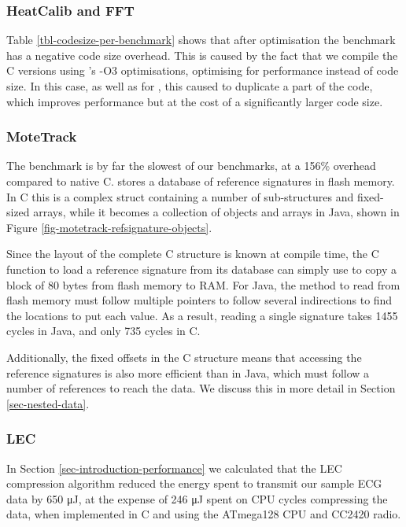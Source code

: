 \subsubsection{HeatCalib and FFT}
Table \ref{tbl-codesize-per-benchmark} shows that after optimisation the  benchmark has a negative code size overhead. This is caused by the fact that we compile the C versions using 's -O3 optimisations, optimising for performance instead of code size. In this case, as well as for , this caused  to duplicate a part of the code, which improves performance but at the cost of a significantly larger code size.

\subsubsection{MoteTrack}
The  benchmark is by far the slowest of our benchmarks, at a 156\% overhead compared to native C.  stores a database of reference signatures in flash memory. In C this is a complex struct containing a number of sub-structures and fixed-sized arrays, while it becomes a collection of objects and arrays in Java, shown in Figure \ref{fig-motetrack-refsignature-objects}.

Since the layout of the complete C structure is known at compile time, the C function to load a reference signature from its database can simply use  to copy a block of 80 bytes from flash memory to RAM. For Java, the method to read from flash memory must follow multiple pointers to follow several indirections to find the locations to put each value. As a result, reading a single signature takes 1455 cycles in Java, and only 735 cycles in C.

Additionally, the fixed offsets in the C structure means that accessing the reference signatures is also more efficient than in Java, which must follow a number of references to reach the data. We discuss this in more detail in Section \ref{sec-nested-data}.

\subsubsection{LEC}
In Section \ref{sec-introduction-performance} we calculated that the LEC compression algorithm reduced the energy spent to transmit our sample ECG data by 650 μJ, at the expense of 246 μJ spent on CPU cycles compressing the data, when implemented in C and using the ATmega128 CPU and CC2420 radio.

